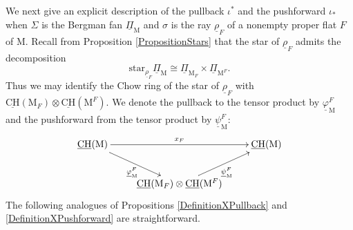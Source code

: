\documentclass[11pt,reqno]{amsart}
\theoremstyle{definition}
\theoremstyle{remark}
\renewcommand{\(}{\left(}
\renewcommand{\)}{\right)}
\newcommand{\<}{\left<}
\renewcommand{\>}{\right>}
\begin{document}
We next give an explicit description of the pullback $\iota^*$ and the pushforward $\iota_*$ when $\Sigma$ is the  Bergman fan $\underline{\Pi}_\mathrm{M}$ and $\sigma$ is the ray $\underline{\rho}_F$ of  a nonempty proper flat $F$ of $\mathrm{M}$.
Recall from Proposition \ref{PropositionStars} that the star of $\underline{\rho}_F$ admits the decomposition
\[
 \text{star}_{\underline{\rho}_F} \underline{\Pi}_\mathrm{M} \cong \underline{\Pi}_{\mathrm{M}_{F}}\times \underline{\Pi}_{\mathrm{M}^F}.
\]
Thus  we may identify the Chow ring of the star of $\underline{\rho}_F$ with $ \underline{\mathrm{CH}}(\mathrm{M}_F)\otimes \underline{\mathrm{CH}}(\mathrm{M}^F)$. 
We denote the pullback to the tensor product by $\underline{\varphi}_\mathrm{M}^F$ and the pushforward  from the tensor product by $\underline{\psi}_\mathrm{M}^F$:
\[
\xymatrix{
\underline{\mathrm{CH}}(\mathrm{M})  \ar[rr]^{x_F} \ar[dr]_{\underline{\varphi}^F_\mathrm{M}}&&\underline{\mathrm{CH}}(\mathrm{M}) 
\\
& \underline{\mathrm{CH}}(\mathrm{M}_F)\otimes \underline{\mathrm{CH}}(\mathrm{M}^F)  \ar[ur]_{\underline{\psi}^F_\mathrm{M}}&
}
\]
The following analogues of Propositions \ref{DefinitionXPullback} and \ref{DefinitionXPushforward} are straightforward.
\end{document}
